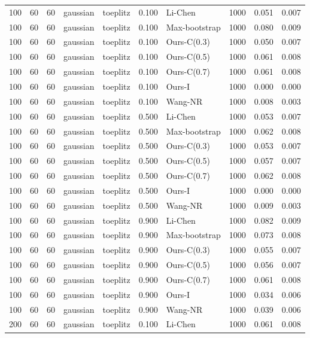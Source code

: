 \begin{tabular}{rrrllrlrrr}
100 & 60 & 60 & gaussian & toeplitz & 0.100 & Li-Chen & 1000 & 0.051 & 0.007 \\
100 & 60 & 60 & gaussian & toeplitz & 0.100 & Max-bootstrap & 1000 & 0.080 & 0.009 \\
100 & 60 & 60 & gaussian & toeplitz & 0.100 & Ours-C(0.3) & 1000 & 0.050 & 0.007 \\
100 & 60 & 60 & gaussian & toeplitz & 0.100 & Ours-C(0.5) & 1000 & 0.061 & 0.008 \\
100 & 60 & 60 & gaussian & toeplitz & 0.100 & Ours-C(0.7) & 1000 & 0.061 & 0.008 \\
100 & 60 & 60 & gaussian & toeplitz & 0.100 & Ours-I & 1000 & 0.000 & 0.000 \\
100 & 60 & 60 & gaussian & toeplitz & 0.100 & Wang-NR & 1000 & 0.008 & 0.003 \\
100 & 60 & 60 & gaussian & toeplitz & 0.500 & Li-Chen & 1000 & 0.053 & 0.007 \\
100 & 60 & 60 & gaussian & toeplitz & 0.500 & Max-bootstrap & 1000 & 0.062 & 0.008 \\
100 & 60 & 60 & gaussian & toeplitz & 0.500 & Ours-C(0.3) & 1000 & 0.053 & 0.007 \\
100 & 60 & 60 & gaussian & toeplitz & 0.500 & Ours-C(0.5) & 1000 & 0.057 & 0.007 \\
100 & 60 & 60 & gaussian & toeplitz & 0.500 & Ours-C(0.7) & 1000 & 0.062 & 0.008 \\
100 & 60 & 60 & gaussian & toeplitz & 0.500 & Ours-I & 1000 & 0.000 & 0.000 \\
100 & 60 & 60 & gaussian & toeplitz & 0.500 & Wang-NR & 1000 & 0.009 & 0.003 \\
100 & 60 & 60 & gaussian & toeplitz & 0.900 & Li-Chen & 1000 & 0.082 & 0.009 \\
100 & 60 & 60 & gaussian & toeplitz & 0.900 & Max-bootstrap & 1000 & 0.073 & 0.008 \\
100 & 60 & 60 & gaussian & toeplitz & 0.900 & Ours-C(0.3) & 1000 & 0.055 & 0.007 \\
100 & 60 & 60 & gaussian & toeplitz & 0.900 & Ours-C(0.5) & 1000 & 0.056 & 0.007 \\
100 & 60 & 60 & gaussian & toeplitz & 0.900 & Ours-C(0.7) & 1000 & 0.061 & 0.008 \\
100 & 60 & 60 & gaussian & toeplitz & 0.900 & Ours-I & 1000 & 0.034 & 0.006 \\
100 & 60 & 60 & gaussian & toeplitz & 0.900 & Wang-NR & 1000 & 0.039 & 0.006 \\
200 & 60 & 60 & gaussian & toeplitz & 0.100 & Li-Chen & 1000 & 0.061 & 0.008 \\

\end{tabular}
